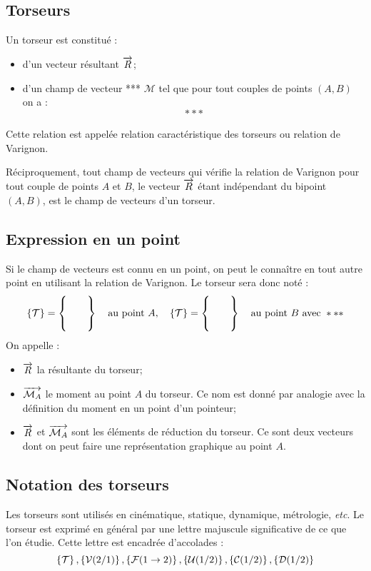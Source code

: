 \documentclass[10pt,oneside]{article}
\begin{document}
\subsection{Torseurs}

\begin{defi}
Un torseur est constitué :
\begin{itemize}
\item d'un vecteur résultant $\overrightarrow{R}$;
\item d'un champ de vecteur *** $\mathcal{M}$ tel que pour tout couples de points $(A,B)$ on a : 
$$*** $$
\end{itemize}
\end{defi}

Cette relation est appelée relation caractéristique des torseurs ou relation de Varignon.

Réciproquement, tout champ de vecteurs   qui vérifie la relation de Varignon pour tout couple de points $A$ et $B$, le vecteur $\overrightarrow{R}$ étant indépendant du bipoint $(A,B)$, est le champ de vecteurs d'un torseur.

\subsection{Expression en un point}
Si le champ de vecteurs est connu en un point, on peut le connaître en tout autre point en utilisant la relation de Varignon. Le torseur sera donc noté :
$$
\left\{{\mathcal{T}}\right\}=\left\{ \begin{array}{cc} {} & {}\\{} & {}\\{} & {}\\\end{array} \right\}_{}
\quad \text{au point }A, \quad 
\left\{{\mathcal{T}}\right\}=\left\{ \begin{array}{cc} {} & {}\\{} & {}\\{} & {}\\\end{array} \right\}_{}
\quad \text{au point }B \text{ avec } ***
$$
On appelle :
\begin{itemize}
\item $\overrightarrow{R}$ la résultante du torseur;
\item $\overrightarrow{\mathcal{M}_A}$ le moment au point $A$ du torseur. Ce nom est donné par analogie avec la définition du moment en un point d'un pointeur;
\item $\overrightarrow{R}$ et $\overrightarrow{\mathcal{M}_A}$ sont les éléments de réduction du torseur. Ce sont deux vecteurs dont on peut faire une représentation graphique au point $A$.
\end{itemize}

\subsection{Notation des torseurs}
Les torseurs sont utilisés en cinématique, statique, dynamique, métrologie, \textit{etc}. Le torseur est exprimé en général par une lettre majuscule significative de ce que l'on étudie. Cette lettre est encadrée d'accolades :
$$
\left\{{\mathcal{T}}\right\}, \left\{{\mathcal{V}(2/1)}\right\}, \left\{{\mathcal{F}(1\rightarrow 2)}\right\}, \left\{{\mathcal{U}(1/2)}\right\}, \left\{{\mathcal{C}(1/2)}\right\}, \left\{{\mathcal{D}(1/2)}\right\}
$$
\end{document}
